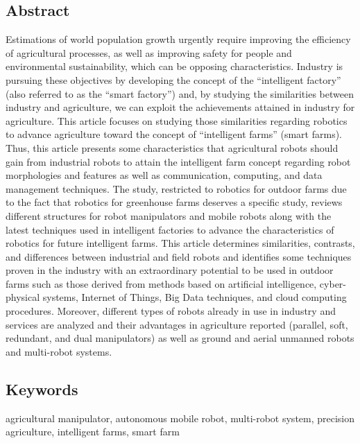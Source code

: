     \subsection*{Abstract}
    Estimations of world population growth urgently require improving the efficiency of
    agricultural processes, as well as improving safety for people and environmental sustainability,
    which can be opposing characteristics. Industry is pursuing these objectives by developing the
    concept of the “intelligent factory” (also referred to as the “smart factory”) and, by studying the
    similarities between industry and agriculture, we can exploit the achievements attained in industry
    for agriculture. This article focuses on studying those similarities regarding robotics to advance
    agriculture toward the concept of “intelligent farms” (smart farms). Thus, this article presents some
    characteristics that agricultural robots should gain from industrial robots to attain the intelligent farm
    concept regarding robot morphologies and features as well as communication, computing, and data
    management techniques. The study, restricted to robotics for outdoor farms due to the fact that robotics
    for greenhouse farms deserves a specific study, reviews different structures for robot manipulators and
    mobile robots along with the latest techniques used in intelligent factories to advance the characteristics
    of robotics for future intelligent farms. This article determines similarities, contrasts, and differences
    between industrial and field robots and identifies some techniques proven in the industry with an
    extraordinary potential to be used in outdoor farms such as those derived from methods based on
    artificial intelligence, cyber-physical systems, Internet of Things, Big Data techniques, and cloud
    computing procedures. Moreover, different types of robots already in use in industry and services
    are analyzed and their advantages in agriculture reported (parallel, soft, redundant, and dual
    manipulators) as well as ground and aerial unmanned robots and multi-robot systems.
    
    \subsection*{Keywords}
    agricultural manipulator, autonomous mobile robot, multi-robot system, precision agriculture, intelligent farms, smart farm
    
     
